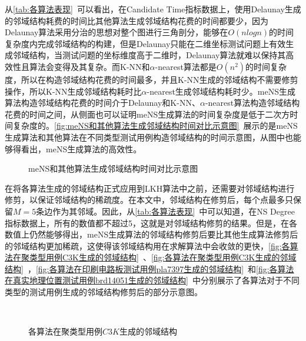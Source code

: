 从\autoref{tab:各算法表现}~可以看出，在Candidate Time指标数据上，使用Delaunay生成的邻域结构耗费的时间比其他算法生成邻域结构花费的时间都要少，因为Delaunay算法采用分治的思想对整个图进行三角剖分，能够在$O(nlogn)$的时间复杂度内完成邻域结构的构建，但是Delaunay只能在二维坐标测试问题上有效生成邻域结构，当测试问题的坐标维度高于二维时，Delaunay算法就难以保持其高效性且算法会变得及其复杂。而K-NN和$\alpha$-nearest算法都是$O(n^2)$的时间复杂度，所以在构造邻域结构花费的时间最多，并且K-NN生成的邻域结构不需要修剪操作，所以K-NN生成邻域结构耗时比$\alpha$-nearest生成邻域结构耗时少。meNS生成算法构造邻域结构花费的时间介于Delaunay和K-NN、$\alpha$-nearest算法构造邻域结构花费的时间之间，从侧面也可以证明meNS生成算法的时间复杂度是低于二次方时间复杂度的。\autoref{fig:meNS和其他算法生成邻域结构时间对比示意图}~展示的是meNS生成算法和其他算法在不同类型测试用例构造邻域结构的时间示意图，从图中也能够得看出，meNS生成算法的高效性。
\begin{figure}[htb]
    \caption[meNS和其他算法生成邻域结构时间对比示意图]{meNS和其他算法生成邻域结构时间对比示意图}
    \label{fig:meNS和其他算法生成邻域结构时间对比示意图}
\end{figure}
\par
在将各算法生成的邻域结构正式应用到LKH算法中之前，还需要对邻域结构进行修剪，以保证邻域结构的稀疏度。在本文中，邻域结构在修剪后，每个点最多只保留$M=5$条边作为其邻域。因此，从\autoref{tab:各算法表现}~中可以知道，在NS Degree指标数据上，所有的数值都不超过5，这就是对邻域结构修剪的结果。但是，在各数值上仍然能够得出，meNS生成算法的邻域结构修剪后要比其他生成算法修剪后的邻域结构更加稀疏，这使得该邻域结构用在求解算法中会收敛的更快，\autoref{fig:各算法在聚类型用例C3K生成的邻域结构}~、\autoref{fig:各算法在聚类型用例C3K生成的邻域结构}~，\autoref{fig:各算法在印刷电路板测试用例pla7397生成的邻域结构}~和\autoref{fig:各算法在真实地理位置测试用例brd14051生成的邻域结构}~中分别展示了各算法对于不同类型的测试用例生成的邻域结构修剪后的部分示意图。
\begin{figure}[t]
     \qquad
     \\
     \qquad
    \caption[各算法在聚类型用例$C3K$生成的邻域结构]{各算法在聚类型用例$C3K$生成的邻域结构}
    \label{fig:各算法在聚类型用例C3K生成的邻域结构}
\end{figure}
